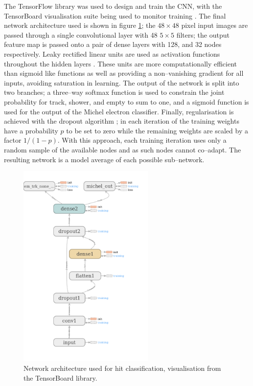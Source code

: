 The TensorFlow library was used to design and train the CNN, with the
TensorBoard visualisation suite being used to monitor training \cite{45381}. The
final network architecture used is shown in figure \ref{fig:arch}; the
\(48\times48\) pixel input images are passed through a single convolutional
layer with 48 \(5\times5\) filters; the output feature map is passed onto a pair
of dense layers with 128, and 32 nodes respectively. Leaky rectified linear
units are used as activation functions throughout the hidden layers
\cite{He2015}. These units are more computationally efficient than sigmoid like
functions as well as providing a non--vanishing gradient for all inputs,
avoiding saturation in learning. The output of the network is split into two
branches; a three--way softmax function is used to constrain the joint
probability for track, shower, and empty to sum to one, and a sigmoid function
is used for the output of the Michel electron classifier. Finally,
regularisation is achieved with the dropout algorithm
\cite{Srivastava2014DropoutAS}; in each iteration of the training weights have a
probability \(p\) to be set to zero while the remaining weights are scaled by a
factor \(1/(1-p)\). With this approach, each training iteration uses only a
random sample of the available nodes and as such nodes cannot co--adapt. The
resulting network is a model average of each possible sub--network.

\begin{figure}[h]
	\centering
	\includegraphics[width=0.6\textwidth]{figures/network_graph.png}
	\caption[Network architecture used for hit classification.]{Network
	architecture used for hit classification, visualisation from the TensorBoard
	library.}
	\label{fig:arch}
\end{figure}

